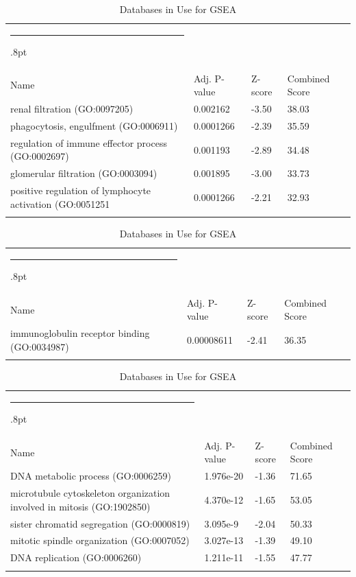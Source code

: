 \documentclass[3p,authoryear,preprint,12pt]{elsarticle}
\makeatletter
\def\hlinewd#1{%
  \noalign{\ifnum0=`}\fi\hrule \@height #1%
  \futurelet\reserved@a\@xhline}
\def\tbltoprule{\hlinewd{.8pt}\\[-12pt]}
\def\tblbottomrule{\noalign{\vspace*{6pt}}\hline\noalign{\vspace*{2pt}}}
\def\tblmidrule{\noalign{\vspace*{6pt}}\hline\noalign{\vspace*{2pt}}}
\makeatother
\begin{document}
\begin{table}[!htbp]
	\caption{{Databases in Use for GSEA} }
	\label{tw-de478ae31cc6}
	\def\arraystretch{1}
	\ignorespaces 
	\centering 
	\begin{tabulary}{\linewidth}{p{\dimexpr.65\tabcolsep}p{\dimexpr.15\tabcolsep}p{\dimexpr.1\tabcolsep}p{\dimexpr.1\tabcolsep}}
		\tbltoprule Name & Adj. P-value & Z-score & Combined Score\\
		\tblmidrule
renal filtration (GO:0097205) & 0.002162 & -3.50 & 38.03 \\
phagocytosis, engulfment (GO:0006911) & 0.0001266 & -2.39 & 35.59 \\
regulation of immune effector process (GO:0002697) & 0.001193 & -2.89 & 34.48 \\
glomerular filtration (GO:0003094) & 0.001895 & -3.00 & 33.73 \\
positive regulation of lymphocyte activation (GO:0051251 & 0.0001266 & -2.21 & 32.93 \\
		\tblbottomrule
	\end{tabulary}\par 
\end{table}
\begin{table}[!htbp]
	\caption{{Databases in Use for GSEA} }
	\label{tw-de478ae31cc6}
	\def\arraystretch{1}
	\ignorespaces 
	\centering 
	\begin{tabulary}{\linewidth}{p{\dimexpr.65\tabcolsep}p{\dimexpr.15\tabcolsep}p{\dimexpr.1\tabcolsep}p{\dimexpr.1\tabcolsep}}
		\tbltoprule Name & Adj. P-value & Z-score & Combined Score\\
		\tblmidrule
immunoglobulin receptor binding (GO:0034987) & 0.00008611 & -2.41 & 36.35 \\
		\tblbottomrule
	\end{tabulary}\par 
\end{table}
\begin{table}[!htbp]
	\caption{{Databases in Use for GSEA} }
	\label{tw-de478ae31cc6}
	\def\arraystretch{1}
	\ignorespaces 
	\centering 
	\begin{tabulary}{\linewidth}{p{\dimexpr.65\tabcolsep}p{\dimexpr.15\tabcolsep}p{\dimexpr.1\tabcolsep}p{\dimexpr.1\tabcolsep}}
		\tbltoprule Name & Adj. P-value & Z-score & Combined Score\\
		\tblmidrule
DNA metabolic process (GO:0006259) & 1.976e-20 & -1.36 & 71.65 \\
microtubule cytoskeleton organization involved in mitosis (GO:1902850) & 4.370e-12 & -1.65 & 53.05 \\
sister chromatid segregation (GO:0000819) & 3.095e-9 & -2.04 & 50.33 \\
mitotic spindle organization (GO:0007052) & 3.027e-13 & -1.39 & 49.10 \\
DNA replication (GO:0006260) & 1.211e-11 & -1.55 & 47.77 \\
		\tblbottomrule
	\end{tabulary}\par 
\end{table}
\end{document}
